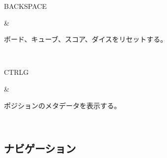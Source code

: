 \documentclass[letterpaper,10pt,dvipdfmx]{sphinxmanual}
\begin{document}
\begin{savenotes}
\begin{tabular}[t]{}
\begin{varwidth}[t]{}
\sphinxAtStartPar
BACKSPACE
\sphinxbeforeendvarwidth
\end{varwidth}%
&\begin{varwidth}[t]{}
\sphinxAtStartPar
ボード、キューブ、スコア、ダイスをリセットする。
\sphinxbeforeendvarwidth
\end{varwidth}%
\\
\sphinxhline\begin{varwidth}[t]{}
\sphinxAtStartPar
CTRL\sphinxhyphen{}G
\sphinxbeforeendvarwidth
\end{varwidth}%
&\begin{varwidth}[t]{}
\sphinxAtStartPar
ポジションのメタデータを表示する。
\sphinxbeforeendvarwidth
\end{varwidth}%
\\
\sphinxbottomrule
\end{tabular}
\sphinxtableafterendhook\par
\sphinxattableend\end{savenotes}


\subsection{ナビゲーション}
\label{\detokenize{raccourcis:navigation}}\label{\detokenize{raccourcis:raccourcis-navigation}}
\end{document}
